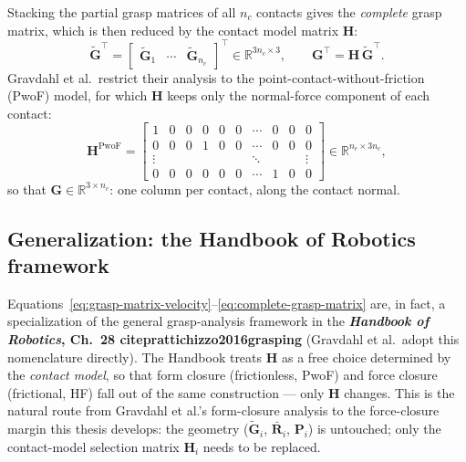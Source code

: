Stacking the partial grasp matrices of all $n_c$ contacts gives the
\emph{complete} grasp matrix, which is then reduced by the contact model
matrix $\boldsymbol{H}$:
\begin{equation}
    \tilde{\boldsymbol{G}}^\top = \begin{bmatrix} \tilde{\boldsymbol{G}}_1 & \cdots & \tilde{\boldsymbol{G}}_{n_c} \end{bmatrix}^\top \in \mathbb{R}^{3n_c \times 3} ,
    \qquad
    \boldsymbol{G}^\top = \boldsymbol{H}\,\tilde{\boldsymbol{G}}^\top .
    \label{eq:complete-grasp-matrix}
\end{equation}
Gravdahl et al.\ restrict their analysis to the point-contact-without-friction
(PwoF) model, for which $\boldsymbol{H}$ keeps only the normal-force component
of each contact:
\begin{equation}
    \boldsymbol{H}^{\mathrm{PwoF}} =
    \begin{bmatrix}
        1 & 0 & 0 & 0 & 0 & 0 & \cdots & 0 & 0 & 0 \\
        0 & 0 & 0 & 1 & 0 & 0 & \cdots & 0 & 0 & 0 \\
        \vdots & & & & & & \ddots & & & \vdots \\
        0 & 0 & 0 & 0 & 0 & 0 & \cdots & 1 & 0 & 0
    \end{bmatrix} \in \mathbb{R}^{n_c \times 3n_c} ,
    \label{eq:H-pwof-gravdahl}
\end{equation}
so that $\boldsymbol{G} \in \mathbb{R}^{3 \times n_c}$: one column per contact,
along the contact normal.

\subsection{Generalization: the Handbook of Robotics framework}
\label{sec:grasp-matrix-handbook}

Equations~\eqref{eq:grasp-matrix-velocity}--\eqref{eq:complete-grasp-matrix} are, in
fact, a specialization of the general grasp-analysis framework in the \textbf{\emph{Handbook of Robotics}, Ch.~28 cite{prattichizzo2016grasping}}
(Gravdahl
et al.\ adopt this nomenclature directly). The Handbook treats $\boldsymbol{H}$
as a free choice determined by the \emph{contact model}, so that form closure
(frictionless, PwoF) and force closure (frictional, HF) fall out of the same
construction — only $\boldsymbol{H}$ changes. This is the natural route from
Gravdahl et al.'s form-closure analysis to the force-closure margin this
thesis develops: the geometry ($\tilde{\boldsymbol{G}}_i$, $\bar{\boldsymbol{R}}_i$,
$\boldsymbol{P}_i$) is untouched; only the contact-model selection matrix
$\boldsymbol{H}_i$ needs to be replaced.

